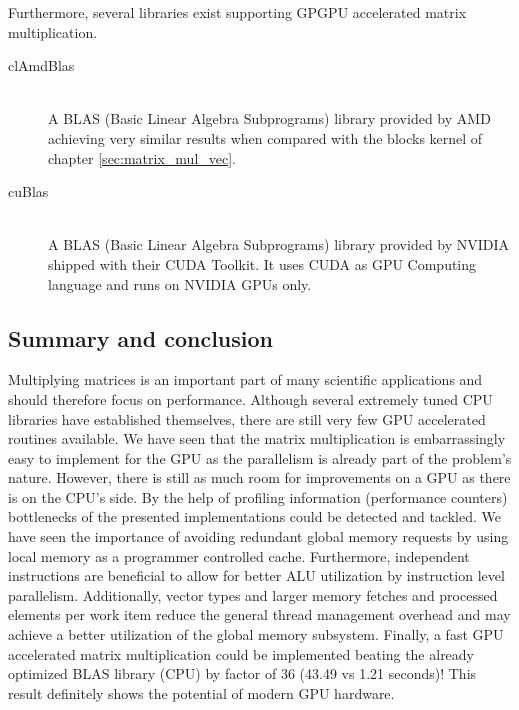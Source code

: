 Furthermore, several libraries exist supporting GPGPU accelerated matrix multiplication.

\begin{description}
   \item[clAmdBlas \cite{cl_amd_blas}] \hfill \\
   A BLAS (Basic Linear Algebra Subprograms) library provided by AMD achieving very similar results when compared with the blocks kernel of chapter \ref{sec:matrix_mul_vec}. 
   \item[cuBlas \cite{cublas}] \hfill \\
   A BLAS (Basic Linear Algebra Subprograms) library provided by NVIDIA shipped with their CUDA Toolkit. It uses CUDA as GPU Computing language and runs on NVIDIA GPUs only.
\end{description}

\subsection{Summary and conclusion}
Multiplying matrices is an important part of many scientific applications and should therefore focus on performance. Although several extremely tuned CPU libraries have established themselves, there are still very few GPU accelerated routines available. We have seen that the matrix multiplication is embarrassingly easy to implement for the GPU as the parallelism is already part of the problem's nature. However, there is still as much room for improvements on a GPU as there is on the CPU's side. By the help of profiling information (performance counters) bottlenecks of the presented implementations could be detected and tackled. We have seen the importance of avoiding redundant global memory requests by using local memory as a programmer controlled cache. Furthermore, independent instructions are beneficial to allow for better ALU utilization by instruction level parallelism. Additionally, vector types and larger memory fetches and processed elements per work item reduce the general thread management overhead and may achieve a better utilization of the global memory subsystem. Finally, a fast GPU accelerated matrix multiplication could be implemented beating the already optimized BLAS library (CPU) by factor of 36 (43.49 vs 1.21 seconds)! This result definitely shows the potential of modern GPU hardware.
